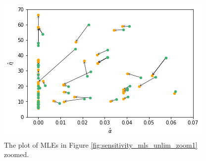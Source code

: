\begin{figure}
    \centering
    \includegraphics[scale=0.8]{pictures/Sensitivity/mles_unlim_zoom2.png}
    \caption[Zoomed in on the MLEs in Figure \ref{fig:sensitivity_mls_unlim_zoom1}]{The plot of MLEs in Figure \ref{fig:sensitivity_mls_unlim_zoom1} zoomed.}
    \label{fig:sensitivity_mls_unlim_zoom2}
\end{figure}



